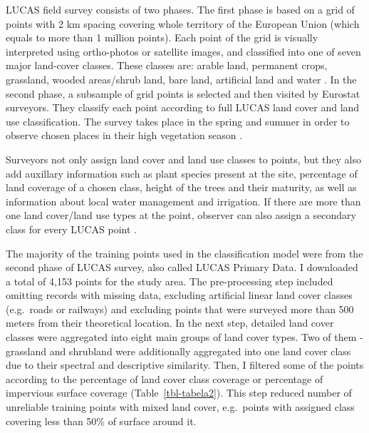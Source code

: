 \documentclass{amuthesis}
\begin{document}
LUCAS field survey consists of two phases. The first phase is based on a
grid of points with 2 km spacing covering whole territory of the
European Union (which equals to more than 1 million points). Each point
of the grid is visually interpreted using ortho-photos or satellite
images, and classified into one of seven major land-cover classes. These
classes are: arable land, permanent crops, grassland, wooded areas/shrub
land, bare land, artificial land and water
\autocite{oliver_buck_analysis_2015}. In the second phase, a subsample
of grid points is selected and then visited by Eurostat surveyors. They
classify each point according to full LUCAS land cover and land use
classification. The survey takes place in the spring and summer in order
to observe chosen places in their high vegetation season
\autocite{dandrimont_harmonised_2020}.

Surveyors not only assign land cover and land use classes to points, but
they also add auxillary information such as plant species present at the
site, percentage of land coverage of a chosen class, height of the trees
and their maturity, as well as information about local water management
and irrigation. If there are more than one land cover/land use types at
the point, observer can also assign a secondary class for every LUCAS
point \autocite{oliver_buck_analysis_2015}.

The majority of the training points used in the classification model
were from the second phase of LUCAS survey, also called LUCAS Primary
Data. I downloaded a total of 4,153 points for the study area. The
pre-processing step included omitting records with missing data,
excluding artificial linear land cover classes (e.g.~roads or railways)
and excluding points that were surveyed more than 500 meters from their
theoretical location. In the next step, detailed land cover classes were
aggregated into eight main groups of land cover types. Two of them -
grassland and shrubland were additionally aggregated into one land cover
class due to their spectral and descriptive similarity. Then, I filtered
some of the points according to the percentage of land cover class
coverage or percentage of impervious surface coverage
(Table~\ref{tbl-tabela2}). This step reduced number of unreliable
training points with mixed land cover, e.g.~points with assigned class
covering less than 50\% of surface around it.
\end{document}
